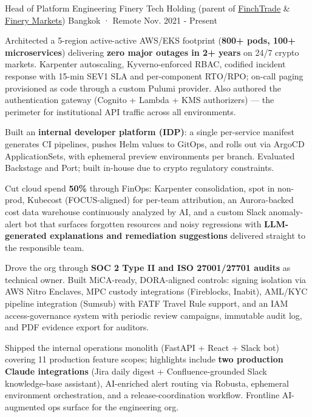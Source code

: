 \documentclass[10pt, a4paper]{awesome-cv}
\begin{document}
\begin{cventries}

  \cventry
    {Head of Platform Engineering}
    {Finery Tech Holding (parent of \href{https://finchtrade.com}{FinchTrade} \& \href{https://finerymarkets.com}{Finery Markets})}
    {Bangkok · Remote}
    {Nov. 2021 - Present}
    {
      \begin{cvitems}
        \item {Architected a 5-region active-active AWS/EKS footprint (\textbf{800+ pods, 100+ microservices}) delivering \textbf{zero major outages in 2+ years} on 24/7 crypto markets. Karpenter autoscaling, Kyverno-enforced RBAC, codified incident response with 15-min SEV1 SLA and per-component RTO/RPO; on-call paging provisioned as code through a custom Pulumi provider. Also authored the authentication gateway (Cognito + Lambda + KMS authorizers) --- the perimeter for institutional API traffic across all environments.}
        \item {Built an \textbf{internal developer platform (IDP)}: a single per-service manifest generates CI pipelines, pushes Helm values to GitOps, and rolls out via ArgoCD ApplicationSets, with ephemeral preview environments per branch. Evaluated Backstage and Port; built in-house due to crypto regulatory constraints.}
        \item {Cut cloud spend \textbf{50\%} through FinOps: Karpenter consolidation, spot in non-prod, Kubecost (FOCUS-aligned) for per-team attribution, an Aurora-backed cost data warehouse continuously analyzed by AI, and a custom Slack anomaly-alert bot that surfaces forgotten resources and noisy regressions with \textbf{LLM-generated explanations and remediation suggestions} delivered straight to the responsible team.}
        \item {Drove the org through \textbf{SOC 2 Type II and ISO 27001/27701 audits} as technical owner. Built MiCA-ready, DORA-aligned controls: signing isolation via AWS Nitro Enclaves, MPC custody integrations (Fireblocks, Inabit), AML/KYC pipeline integration (Sumsub) with FATF Travel Rule support, and an IAM access-governance system with periodic review campaigns, immutable audit log, and PDF evidence export for auditors.}
        \item {Shipped the internal operations monolith (FastAPI + React + Slack bot) covering 11 production feature scopes; highlights include \textbf{two production Claude integrations} (Jira daily digest + Confluence-grounded Slack knowledge-base assistant), AI-enriched alert routing via Robusta, ephemeral environment orchestration, and a release-coordination workflow. Frontline AI-augmented ops surface for the engineering org.}

\end{cvitems}}
\end{cventries}
\end{document}
